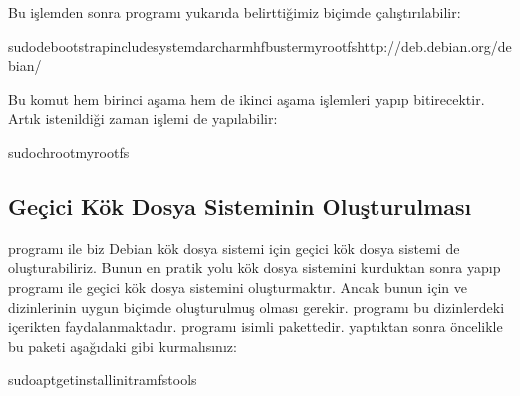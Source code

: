 \documentclass[a4paper,10pt,turkish]{sphinxmanual}
\begin{document}
\sphinxAtStartPar
Bu işlemden sonra  programı yukarıda belirttiğimiz biçimde çalıştırılabilir:

\begin{sphinxVerbatim}[commandchars=\\\{\}]
\PYGZdl{}sudodebootstrap\PYGZhy{}\PYGZhy{}includesystemd\PYGZhy{}\PYGZhy{}archarmhfbustermyrootfshttp://deb.debian.org/debian/
\end{sphinxVerbatim}

\sphinxAtStartPar
Bu komut hem birinci aşama hem de ikinci aşama işlemleri yapıp bitirecektir. Artık istenildiği zaman
 işlemi de yapılabilir:

\begin{sphinxVerbatim}[commandchars=\\\{\}]
\PYGZdl{}sudochrootmyrootfs
\end{sphinxVerbatim}


\subsection{Geçici Kök Dosya Sisteminin Oluşturulması}
\label{\detokenize{kernelcompilation:gecici-kok-dosya-sisteminin-olusturulmasi}}
\sphinxAtStartPar
{} programı ile biz Debian kök dosya sistemi için geçici kök dosya sistemi de oluşturabiliriz.
Bunun en pratik yolu kök dosya sistemini kurduktan sonra  yapıp  programı ile
geçici kök dosya sistemini oluşturmaktır. Ancak bunun için  ve  dizinlerinin
uygun biçimde oluşturulmuş olması gerekir.  programı bu dizinlerdeki içerikten
faydalanmaktadır.  programı  isimli pakettedir.  yaptıktan
sonra öncelikle bu paketi aşağıdaki gibi kurmalısınız:

\begin{sphinxVerbatim}[commandchars=\\\{\}]
\PYGZdl{}sudoapt\PYGZhy{}getinstallinitramfs\PYGZhy{}tools
\end{sphinxVerbatim}
\end{document}
